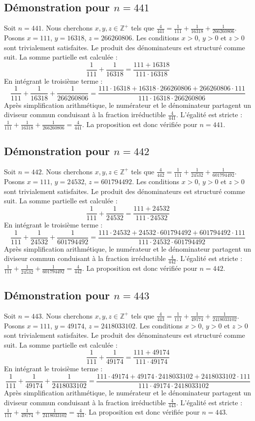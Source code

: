 \documentclass[11pt,a4paper]{article}
\begin{document}
\subsection{Démonstration pour $n = 441$}
Soit $n = 441$. Nous cherchons $x, y, z \in \mathbb{Z}^{+}$ tels que $\frac{4}{441} = \frac{1}{111} + \frac{1}{16318} + \frac{1}{266260806}$.
Posons $x = 111$, $y = 16318$, $z = 266260806$.
Les conditions $x > 0$, $y > 0$ et $z > 0$ sont trivialement satisfaites.
Le produit des dénominateurs est structuré comme suit. La somme partielle est calculée :
$$ \frac{1}{111} + \frac{1}{16318} = \frac{111+16318}{111 \cdot 16318} $$
En intégrant le troisième terme :
$$ \frac{1}{111} + \frac{1}{16318} + \frac{1}{266260806} = \frac{111 \cdot 16318 + 16318 \cdot 266260806 + 266260806 \cdot 111}{111 \cdot 16318 \cdot 266260806} $$
Après simplification arithmétique, le numérateur et le dénominateur partagent un diviseur commun conduisant à la fraction irréductible $\frac{4}{441}$.
L'égalité est stricte : $\frac{1}{111} + \frac{1}{16318} + \frac{1}{266260806} = \frac{4}{441}$.
La proposition est donc vérifiée pour $n = 441$.
\subsection{Démonstration pour $n = 442$}
Soit $n = 442$. Nous cherchons $x, y, z \in \mathbb{Z}^{+}$ tels que $\frac{4}{442} = \frac{1}{111} + \frac{1}{24532} + \frac{1}{601794492}$.
Posons $x = 111$, $y = 24532$, $z = 601794492$.
Les conditions $x > 0$, $y > 0$ et $z > 0$ sont trivialement satisfaites.
Le produit des dénominateurs est structuré comme suit. La somme partielle est calculée :
$$ \frac{1}{111} + \frac{1}{24532} = \frac{111+24532}{111 \cdot 24532} $$
En intégrant le troisième terme :
$$ \frac{1}{111} + \frac{1}{24532} + \frac{1}{601794492} = \frac{111 \cdot 24532 + 24532 \cdot 601794492 + 601794492 \cdot 111}{111 \cdot 24532 \cdot 601794492} $$
Après simplification arithmétique, le numérateur et le dénominateur partagent un diviseur commun conduisant à la fraction irréductible $\frac{4}{442}$.
L'égalité est stricte : $\frac{1}{111} + \frac{1}{24532} + \frac{1}{601794492} = \frac{4}{442}$.
La proposition est donc vérifiée pour $n = 442$.
\subsection{Démonstration pour $n = 443$}
Soit $n = 443$. Nous cherchons $x, y, z \in \mathbb{Z}^{+}$ tels que $\frac{4}{443} = \frac{1}{111} + \frac{1}{49174} + \frac{1}{2418033102}$.
Posons $x = 111$, $y = 49174$, $z = 2418033102$.
Les conditions $x > 0$, $y > 0$ et $z > 0$ sont trivialement satisfaites.
Le produit des dénominateurs est structuré comme suit. La somme partielle est calculée :
$$ \frac{1}{111} + \frac{1}{49174} = \frac{111+49174}{111 \cdot 49174} $$
En intégrant le troisième terme :
$$ \frac{1}{111} + \frac{1}{49174} + \frac{1}{2418033102} = \frac{111 \cdot 49174 + 49174 \cdot 2418033102 + 2418033102 \cdot 111}{111 \cdot 49174 \cdot 2418033102} $$
Après simplification arithmétique, le numérateur et le dénominateur partagent un diviseur commun conduisant à la fraction irréductible $\frac{4}{443}$.
L'égalité est stricte : $\frac{1}{111} + \frac{1}{49174} + \frac{1}{2418033102} = \frac{4}{443}$.
La proposition est donc vérifiée pour $n = 443$.
\end{document}
